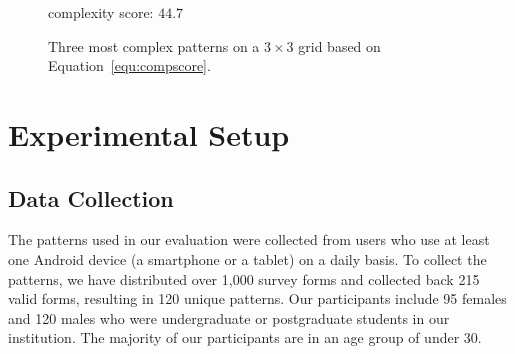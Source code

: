 \begin{figure}[!t]
{\begin{minipage}[b]{0.14\textwidth}
                \centering \footnotesize complexity score: $44.7$
                \end{minipage}
            }
            \vspace{-2mm}
            \caption{Three most complex patterns on a $3\times 3$ grid based on Equation~\ref{equ:compscore}.}
            \vspace{-2mm}
            \label{fig:most complex patterns}
        \end{figure}
\vspace{-5mm}

\section{Experimental Setup \label{sec:setup}}
    \subsection{Data Collection}
    \label{section:locking patterns}
    The patterns used in our evaluation were collected from users who use at least one Android device (a smartphone or a tablet) on a daily basis.
    To collect the patterns, we have distributed over 1,000 survey forms and collected back 215 valid forms, resulting in 120 unique patterns.
    Our participants include 95 females and 120 males who were undergraduate or postgraduate students in our institution.
    The majority of our participants are in an age group of under 30.


